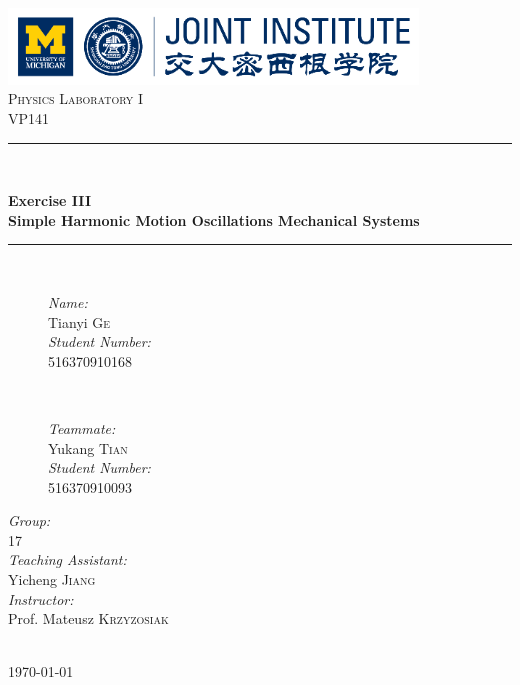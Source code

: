 \begin{titlepage}

\newcommand{\HRule}{\rule{\linewidth}{0.5mm}}

\center

\includegraphics[height=0.8in]{images/logo.png}\\[1cm]

\textsc{\Large Physics Laboratory I}\\[0.4cm]
\textsc{\large VP141}\\[0.4cm]

\HRule \\[0.4cm]
{
    \bfseries
    {\huge Exercise III}\\[0.3cm]
    {\large Simple Harmonic Motion Oscillations Mechanical Systems}\\[0.2cm]
    \HRule \\[1.5cm]
}
\begin{figure}[h]
    \hspace{3cm}
    \begin{minipage}{0.4\textwidth}
        \large
        \emph{Name:}\\
        Tianyi \textsc{Ge} \\

        \emph{Student Number:}\\
        516370910168
    \end{minipage}
    ~
    \begin{minipage}{0.4\textwidth}
        \large
        \emph{Teammate:}\\
        Yukang \textsc{Tian} \\

        \emph{Student Number:}\\
        516370910093
    \end{minipage}
\end{figure}

\vspace{1cm}

\begin{minipage}{0.4\textwidth}
    \large
    \emph{Group:}\\
    17\\

    \emph{Teaching Assistant:}\\
    Yicheng \textsc{Jiang}\\

    \emph{Instructor:}\\
    Prof. Mateusz \textsc{Krzyzosiak}
\end{minipage}\\[2cm]

{\large \today}\\[2cm]

\vfill

\end{titlepage}